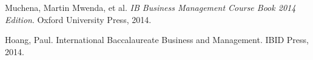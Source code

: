 
\begin{thebibliography}{12}


%




Muchena, Martin Mwenda, et al. \emph{IB Business Management Course Book 2014 Edition}. Oxford University Press, 2014.


Hoang, Paul. International Baccalaureate Business and Management. IBID Press, 2014.

%





%

%



%

%

%

%

%

%

%

%

%

%

%

%

%

%

%

%

%

%

%

%

%


\end{thebibliography}



